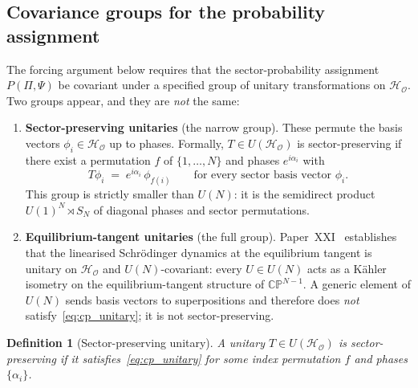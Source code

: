 \documentclass[12pt]{article}
\newtheorem{definition}[theorem]{Definition}
\newcommand{\Ocal}{\mathcal{O}}
\newcommand{\Hcal}{\mathcal{H}}
\begin{document}
\subsection{Covariance groups for the probability assignment}\label{subsec:sufficient}

The forcing argument below requires that the sector-probability assignment $P(\Pi, \Psi)$ be covariant under a specified group of unitary transformations on $\Hcal_\Ocal$. Two groups appear, and they are \emph{not} the same:

\begin{enumerate}
    \item \textbf{Sector-preserving unitaries} (the narrow group). These permute the basis vectors $\phi_i \in \Hcal_\Ocal$ up to phases. Formally, $T \in U(\Hcal_\Ocal)$ is sector-preserving if there exist a permutation $f$ of $\{1, \ldots, N\}$ and phases $e^{i\alpha_i}$ with
    \begin{equation}\label{eq:cp_unitary}
        T \phi_i \;=\; e^{i\alpha_i}\, \phi_{f(i)} \qquad \text{for every sector basis vector } \phi_i.
    \end{equation}
    This group is strictly smaller than $U(N)$: it is the semidirect product $U(1)^N \rtimes S_N$ of diagonal phases and sector permutations.
    \item \textbf{Equilibrium-tangent unitaries} (the full group). Paper~XXI~\citep{SmartXXI} establishes that the linearised Schr\"odinger dynamics at the equilibrium tangent is unitary on $\Hcal_\Ocal$ and $U(N)$-covariant: every $U \in U(N)$ acts as a K\"ahler isometry on the equilibrium-tangent structure of $\mathbb{CP}^{N-1}$. A generic element of $U(N)$ sends basis vectors to superpositions and therefore does \emph{not} satisfy~\eqref{eq:cp_unitary}; it is not sector-preserving.
\end{enumerate}

\begin{definition}[Sector-preserving unitary]\label{def:cp_unitary}
A unitary $T \in U(\Hcal_\Ocal)$ is \emph{sector-preserving} if it satisfies~\eqref{eq:cp_unitary} for some index permutation $f$ and phases $\{\alpha_i\}$.
\end{definition}
\end{document}
